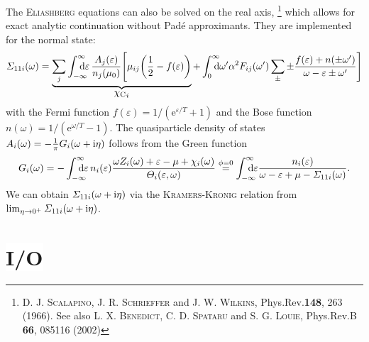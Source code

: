 \documentclass[a4paper]{article}
\let\Re\relax
\let\Im\relax
\DeclareMathOperator\Re{Re}
\DeclareMathOperator\Im{Im}
\def\D{\mathrm d}
\def\E{\mathrm e}
\def\I{\mathrm i}
\def\sub#1{\sb{\mathrm{#1}}}
\def\from#1{\sb{\mathrlap{#1}}}
\def\till#1{\sp{\mathrlap{#1}}}
\let\epsilon\varepsilon
\let\Sigma\varSigma
\let\Theta\varTheta
\def\headline#1{\section*{%
   \normalsize\normalfont%
   \rlap{\rule[0.5ex]\textwidth{0.4pt}}%
   \qquad\colorbox{white}{#1}%
   }}
\begin{document}
   The \textsc{Eliashberg} equations can also be solved on the real axis,%
   \footnote{%
      D. J. \textsc{Scalapino}, J. R. \textsc{Schrieffer} and J. W.
      \textsc{Wilkins}, Phys.\@  Rev.\@ \textbf{148}, 263 (1966).
      \newline
      See also L. X. \textsc{Benedict}, C. D. \textsc{Spataru} and S. G.
      \textsc{Louie}, Phys.\@ Rev.\@ B \textbf{66}, 085116 (2002)
      }
   which allows for exact analytic continuation without Pad\'e approximants.
   They are implemented for the normal state:
   \begin{equation}
      \Sigma_{1 1 i}(\omega) = \underbrace{
      \sum_j
      \int \from{-\infty} \till \infty \D \epsilon \,
      \frac{A_j(\epsilon)}{n_j(\mu_0)}
      \Biggl[
         \mu_{i j}
         \biggl( \frac12 - f(\epsilon) \biggr)
            }_{\displaystyle {\chi \sub C}_i}
         + \int \from 0 \till \infty \D \omega'
         \alpha^2 F_{i j}(\omega')
         \sum_\pm \pm \frac{f(\epsilon) + n(\pm \omega')}
            {\omega - \epsilon \pm \omega'}
      \Biggr]
      \label{real-axis equations}
   \end{equation}
   with the Fermi function $f(\epsilon) = 1 / (\E^{\epsilon / T} + 1)$ and the
   Bose function $n(\omega) = 1 / (\E^{\omega / T} - 1)$. The quasiparticle
   density of states $A_i(\omega) = -\frac 1 \pi \Im G_i(\omega + \I \eta)$
   follows from the Green function
   \begin{equation*}
      G_i(\omega) =
      -\int \from{-\infty} \till \infty \D \epsilon \,
      n_i(\epsilon)
      \frac{\omega Z_i(\omega)
         + \epsilon - \mu + \chi_i(\omega)}
         {\Theta_i(\epsilon, \omega)}
      \overset{\phi = 0} =
      \int \from{-\infty} \till \infty \D \epsilon
      \frac{n_i(\epsilon)}
         {\omega - \epsilon + \mu - \Sigma_{1 1 i}(\omega)}.
   \end{equation*}
   We can obtain $\Re \Sigma_{1 1 i}(\omega + \I \eta)$ via the
   \textsc{Kramers}-\textsc{Kronig} relation from $\lim_{\eta \rightarrow 0^+}
   \Im \Sigma_{1 1 i}(\omega + \I \eta)$.

   \headline{I/O}
\end{document}
